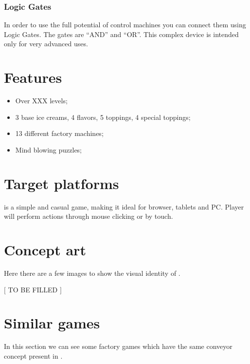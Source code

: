\documentclass[a4paper]{scrartcl}
\begin{document}
        \subsubsection{Logic Gates}
            In order to use the full potential of control machines you can
            connect them using Logic Gates. The gates are ``AND'' and ``OR''.
            This complex device is intended only for very advanced uses.

\section{Features}
    \begin{itemize}
        \item Over XXX levels;
        \item 3 base ice creams, 4 flavors, 5 toppings, 4 special toppings;
        \item 13 different factory machines;
        \item Mind blowing puzzles;
    \end{itemize}

\section{Target platforms}
    \gamename is a simple and casual game, making it ideal for browser, tablets
    and PC. Player will perform actions through mouse clicking or by touch.

\section{Concept art}
    Here there are a few images to show the visual identity of \gamename.

    \centering
    $[$ TO BE FILLED $]$

\section{Similar games}
    In this section we can see some factory games which have the same conveyor
    concept present in \gamename.
\end{document}
